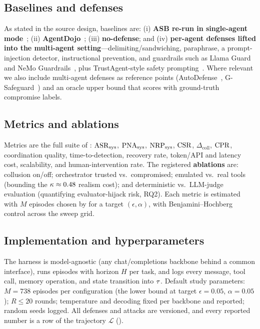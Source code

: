 \subsection{Baselines and defenses}
As stated in the source design, baselines are: (i) \textbf{ASB re-run in single-agent
mode}~\cite{zhang2025asb}; (ii) \textbf{AgentDojo}~\cite{debenedetti2024agentdojo};
(iii) \textbf{no-defense}; and (iv) \textbf{per-agent defenses lifted into the multi-agent
setting}---delimiting/sandwiching, paraphrase, a prompt-injection detector, instructional
prevention, and guardrails such as Llama Guard~\cite{inan2023llamaguard} and NeMo
Guardrails~\cite{rebedea2023nemo}, plus TrustAgent-style safety
prompting~\cite{hua2024trustagent}. Where relevant we also include multi-agent defenses as
reference points (AutoDefense~\cite{zeng2024autodefense}, G-Safeguard~\cite{yu2025gsafeguard})
and an oracle upper bound that scores with ground-truth compromise labels.

\subsection{Metrics and ablations}
Metrics are the full suite of : $\mathrm{ASR}_{\mathrm{sys}}$, $\mathrm{PNA}_{\mathrm{sys}}$, $\mathrm{NRP}_{\mathrm{sys}}$, $\mathrm{CSR}$,
$\Delta_{\mathrm{coll}}$, $\mathrm{CPR}$, coordination quality, time-to-detection, recovery rate,
token/API and latency cost, scalability, and human-intervention rate. The registered
\textbf{ablations} are: collusion on/off; orchestrator trusted vs.\ compromised; emulated
vs.\ real tools (bounding the $\kappa\approx0.48$ realism cost); and deterministic vs.\
LLM-judge evaluation (quantifying evaluator-hijack risk, RQ2). Each metric is estimated with
$M$ episodes chosen by \Cref{thm:sample} for a target $(\epsilon,\alpha)$, with Benjamini--Hochberg
control across the sweep grid.

\subsection{Implementation and hyperparameters}
The harness is model-agnostic (any chat/completions backbone behind a common interface),
runs episodes with horizon $H$ per task, and logs every message, tool call, memory
operation, and state transition into $\tau$. Default study parameters: $M{=}738$ episodes per
configuration (the \Cref{thm:sample} lower bound at target $\epsilon{=}0.05$,
$\alpha{=}0.05$); $R\!\le\!20$ \corb{} rounds; temperature and decoding fixed per backbone
and reported; random seeds logged. All defenses and attacks are versioned, and every reported
number is a row of the \corb{} trajectory $\mathcal{L}$ (\Cref{alg:corb}).

